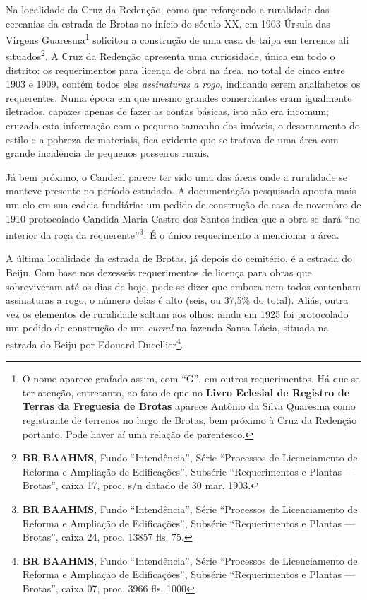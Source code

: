 Na localidade da Cruz da Redenção, como que reforçando a ruralidade das cercanias da estrada de Brotas no início do século XX, em 1903 Úrsula das Virgens Guaresma\footnote{O nome aparece grafado assim, com ``G'', em outros requerimentos. Há que se ter atenção, entretanto, ao fato de que no \textbf{Livro Eclesial de Registro de Terras da Freguesia de Brotas} aparece Antônio da Silva Quaresma como registrante de terrenos no largo de Brotas, bem próximo à Cruz da Redenção portanto. Pode haver aí uma relação de parentesco.} solicitou a construção de uma casa de taipa em terrenos ali situados\footnote{\textbf{BR BAAHMS}, Fundo ``Intendência'', Série ``Processos de Licenciamento de Reforma e Ampliação de Edificações'', Subsérie ``Requerimentos e Plantas --- Brotas'', caixa 17, proc. s/n datado de 30 mar. 1903.}. A Cruz da Redenção apresenta uma curiosidade, única em todo o distrito: os requerimentos para licença de obra na área, no total de cinco entre 1903 e 1909, contém todos eles \textit{assinaturas a rogo}, indicando serem analfabetos os requerentes. Numa época em que mesmo grandes comerciantes eram igualmente iletrados, capazes apenas de fazer as contas básicas, isto não era incomum; cruzada esta informação com o pequeno tamanho dos imóveis, o desornamento do estilo e a pobreza de materiais, fica evidente que se tratava de uma área com grande incidência de pequenos posseiros rurais. 

Já bem próximo, o Candeal parece ter sido uma das áreas onde a ruralidade se manteve presente no período estudado. A documentação pesquisada aponta mais um elo em  sua cadeia fundiária: um pedido de construção de casa de novembro de 1910 protocolado Candida Maria Castro dos Santos indica que a obra se dará ``no interior da roça da requerente''\footnote{\textbf{BR BAAHMS}, Fundo ``Intendência'', Série ``Processos de Licenciamento de Reforma e Ampliação de Edificações'', Subsérie ``Requerimentos e Plantas --- Brotas'', caixa 24, proc. 13857 fls. 75.}. É o único requerimento a mencionar a área.

A última localidade da estrada de Brotas, já depois do cemitério, é a estrada do Beiju. Com base nos dezesseis requerimentos de licença para obras que sobreviveram até os dias de hoje, pode-se dizer que embora nem todos contenham assinaturas a rogo, o número delas é alto (seis, ou 37,5\% do total). Aliás, outra vez os elementos de ruralidade saltam aos olhos: ainda em 1925 foi protocolado um pedido de construção de um \textit{curral} na fazenda Santa Lúcia, situada na estrada do Beiju por Edouard Ducellier\footnote{\textbf{BR BAAHMS}, Fundo ``Intendência'', Série ``Processos de Licenciamento de Reforma e Ampliação de Edificações'', Subsérie ``Requerimentos e Plantas --- Brotas'', caixa 07, proc. 3966 fls. 1000}.

